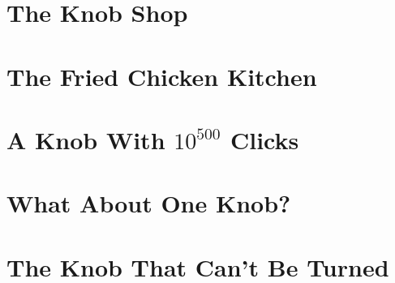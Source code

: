 \documentclass[10pt,openany]{book}
\begin{document}
\frontmatter

\tableofcontents



\mainmatter
\part{The Knob Shop}




\part{The Fried Chicken Kitchen}






\part{A Knob With \texorpdfstring{$10^{500}$}{10\textasciicircum 500} Clicks}


\part{What About One Knob?}




\part{The Knob That Can't Be Turned}



\appendix


\backmatter

\end{document}
